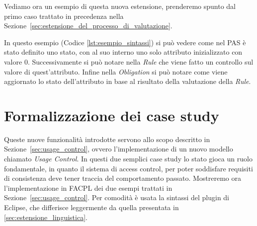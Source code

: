 Vediamo ora un esempio di questa nuova estensione, prenderemo spunto dal primo caso trattato in precedenza nella Sezione~\ref{sec:estensione_del_processo_di_valutazione}.

In questo esempio (Codice \ref{lst:esempio_sintassi}) si può vedere come nel PAS è stato definito uno stato, con al suo interno uno solo attributo inizializzato con valore $0$.
Successivamente si può notare nella \textit{Rule} che viene fatto un controllo sul valore di quest'attributo.
Infine nella \textit{Obligation} si può notare come viene aggiornato lo stato dell'attributo in base al risultato della valutazione della \textit{Rule}.

\section{Formalizzazione dei case study} %
\label{sec:esempi}

Queste nuove funzionalità introdotte servono allo scopo descritto in Sezione~\ref{sec:usage_control}, ovvero l'implementazione di un nuovo modello chiamato \textit{Usage Control}.
In questi due semplici case study lo stato gioca un ruolo fondamentale, in quanto il sistema di access control, per poter soddisfare requisiti di consistenza deve tener traccia del comportamento passato.
Mostreremo ora l'implementazione in FACPL dei due esempi trattati in Sezione~\ref{sec:usage_control}. Per comodità è usata la sintassi del plugin di Eclipse, che differisce leggermente da quella presentata in \ref{sec:estensione_linguistica}. 

